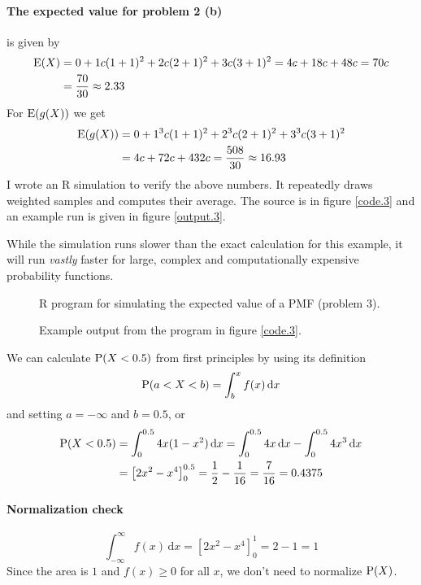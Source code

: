 \documentclass[a4paper,english,12pt]{article}
\begin{document}
\paragraph{The expected value for problem 2 (b)} is given by
\begin{align*}
  \mathrm{E}(X) &=
    0 +
    1 c(1+1)^2 +
    2 c(2+1)^2 +
    3 c(3+1)^2 =
    4c + 18c + 48c = 70c \\
    &= \frac{70}{30} \approx 2.33
\end{align*}
For $\mathrm{E}(g(X))$ we get
\begin{align*}
  \mathrm{E}(g(X)) &=
    0 +
    1^3 c(1+1)^2 +
    2^3 c(2+1)^2 +
    3^3 c(3+1)^2 \\
    &=  4c + 72c + 432c = \frac{508}{30} \approx 16.93
\end{align*}
I wrote an R simulation to verify the above numbers. It repeatedly draws
weighted samples and computes their average. The source is in figure
\vref{code.3} and an example run is given in figure \vref{output.3}.

While the simulation runs slower than the exact calculation for this example,
it will run \textit{vastly} faster for large, complex and computationally
expensive probability functions.
\begin{figure}[H]
  
  \caption{R program for simulating the expected value of a PMF (problem 3).}
  \label{code.3}
\end{figure}
\begin{figure}[H]
  
  \caption{Example output from the program in figure \vref{code.3}.}
  \label{output.3}
\end{figure}

We can calculate $\mathrm{P}(X < 0.5)$ from first principles by using its definition
\begin{equation}
  \label{eq.4a}
  \mathrm{P}(a < X < b) = \int_b^x{f(x)\, \mathrm{d} x}
\end{equation} and setting $a=-\infty$ and $b=0.5$, or
\begin{align*}
  \mathrm{P}(X < 0.5) &=
    \int_0^{0.5} 4x(1-x^2)\, \mathrm{d} x =
    \int_0^{0.5} 4x\, \mathrm{d} x - \int_0^{0.5} 4x^3\, \mathrm{d} x \\
  &=
    \left[2x^2 - x^4 \right]_0^{0.5}
  = \frac{1}{2} - \frac{1}{16} = \frac{7}{16} = 0.4375
\end{align*}
\paragraph{Normalization check}
\[
  \int_{-\infty}^{\infty} f(x)\, \mathrm{d} x =
    \left[ 2x^2 - x^4 \right]_{0}^{1} = 2 - 1 = 1
\]%
Since the area is $1$ and $f(x) \geqslant 0$ for all
$x$, we don't need to normalize $\mathrm{P}(X)$.
\end{document}
